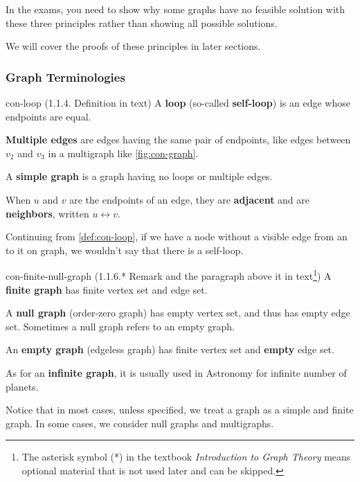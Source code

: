\documentclass[../src/handouts/main.tex]{subfiles}
\begin{document}
In the exams, you need to show why some graphs have no feasible solution with these three principles rather than showing all possible solutions.

We will cover the proofs of these principles in later sections. %

\subsubsection{Graph Terminologies}

\begin{definition}{}{con-loop}
  (1.1.4. Definition in text)
  A \textbf{loop} (so-called \textbf{self-loop}) is an edge whose endpoints are equal.

  \textbf{Multiple edges} are edges having the same pair of endpoints, like edges between $v_2$ and $v_3$ in a multigraph like \cref{fig:con-graph}.

  A \textbf{simple graph} is a graph having no loops or multiple edges.

  When $u$ and $v$ are the endpoints of an edge, they are \textbf{adjacent} and are \textbf{neighbors}, written $u \leftrightarrow v$.
\end{definition}

Continuing from \cref{def:con-loop}, if we have a node without a visible edge from an to it on graph, we wouldn't say that there is a self-loop.

\begin{definition}{}{con-finite-null-graph}
  (1.1.6.* Remark and the paragraph above it in text\footnote{The asterisk symbol (*) in the textbook \textit{Introduction to Graph Theory} means optional material that is not used later and can be skipped.})
  A \textbf{finite graph} has finite vertex set and edge set.

  A \textbf{null graph} (order-zero graph) has empty vertex set, and thus has empty edge set. Sometimes a null graph refers to an empty graph.

  An \textbf{empty graph} (edgeless graph) has finite vertex set and \textbf{empty} edge set.

  As for an \textbf{infinite graph}, it is usually used in Astronomy for infinite number of planets.
\end{definition}

Notice that in most cases, unless specified, we treat a graph as a simple and finite graph. In some cases, we consider null graphs and multigraphs.
\end{document}
